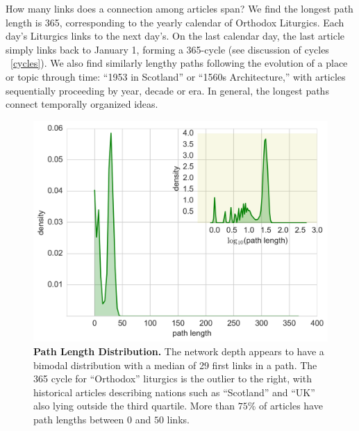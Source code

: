 How many links does a connection among articles span? 
We find the longest path length is 365,
corresponding to the yearly calendar of Orthodox Liturgics.
Each day's Liturgics links to the next day's. On the last calendar day, the last article simply links back to January 1, forming a 365-cycle 
(see discussion of cycles ~\ref{cycles}).
We also find similarly lengthy paths following the evolution of a place or topic through time: 
``1953 in Scotland'' or ``1560s Architecture,'' with articles sequentially proceeding by year, decade or era.
In general, the longest paths connect temporally organized ideas.

\begin{figure}[tp!]
  \includegraphics[width=\columnwidth]{graphics/path_lengths_dist.png}
  \caption{
    \textbf{Path Length Distribution.}
The network depth appears to have a bimodal distribution with a median of 29 first links in a path.
The 365 cycle for ``Orthodox'' liturgics is the outlier to the right, with historical articles 
describing nations such as ``Scotland'' and ``UK'' also lying outside the third quartile.
More than $75\%$ of articles have path lengths between 
$0$ and $50$ links.}
  \label{fig:Path Length Distribution}
\end{figure}

